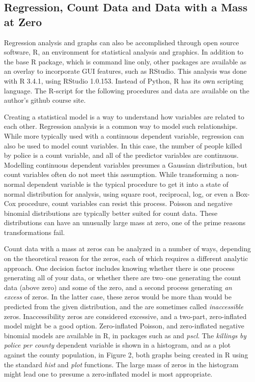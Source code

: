 \documentclass[sigconf]{acmart}
\begin{document}
\subsection{Regression, Count Data and Data with a Mass at Zero}
Regression analysis and graphs can also be accomplished through open source software, R, an environment for statistical analysis and graphics. \cite{r}  In addition to the base R package, which is command line only, other packages are available as an overlay to incorporate GUI features, such as RStudio. \cite{rstudio}  This analysis was done with R 3.4.1, using RStudio 1.0.153.  Instead of Python, R has its own scripting language.  The R-script for the following procedures and data are available on the author's github course site. \cite{townsley}

Creating a statistical model is a way to understand how variables are related to each other.  Regression analysis is a common way to model such relationships.  While more typically used with a continuous dependent variable, regression can also be used to model count variables. \cite{kaminski05} In this case, the number of people killed by police is a count variable, and all of the predictor variables are continuous.  Modelling continuous dependent variables presumes a Gaussian distribution, but count variables often do not meet this assumption. \cite{fox15} While transforming a non-normal dependent variable is the typical procedure to get it into a state of normal distribution for analysis, using square root, reciprocal, log, or even a Box-Cox procedure, count variables can resist this process.  Poisson and negative binomial distributions are typically better suited for count data. \cite{martin17} These distributions can have an unusually large mass at zero, one of the prime reasons transformations fail. \cite{farewell17,beaujean16,gamlss,fox15,neelon16} 

Count data with a mass at zeros can be analyzed in a number of ways, depending on the theoretical reason for the zeros, each of which requires a different analytic approach.  One decision factor includes knowing whether there is one process generating all of your data, or whether there are two--one generating the count data (above zero) and some of the zero, and a second process generating {\em an excess} of zeros. \cite{neelon16,farewell17,min02,martin17}  In the latter case, these zeros would be more than would be predicted from the given distribution, and the are sometimes called {\em inaccessible} zeros.  Inaccessibility zeros are considered excessive, and a two-part, zero-inflated model might be a good option.  Zero-inflated Poisson, and zero-inflated negative binomial models are available in R, in packages such as {\emgamlss} and {\em pscl}. \cite{gamlss} The {\em killings by police per county} dependent variable is shown in a histogram, and as a plot against the county population, in Figure 2, both graphs being created in R using the standard {\em hist} and {\em plot} functions.  The large mass of zeros in the histogram might lead one to presume a zero-inflated model is most appropriate.
\end{document}
